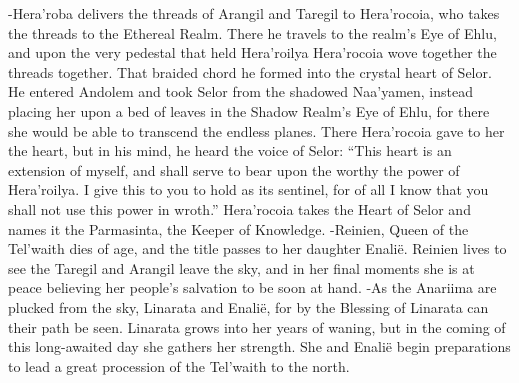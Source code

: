 \documentclass[smalldemyvopaper,11pt,twoside,onecolumn,openright,extrafontsizes]{memoir}
\begin{document}
{{-Hera’roba delivers the threads of Arangil and Taregil to Hera’rocoia, who takes the threads to the Ethereal Realm. There he travels to the realm’s Eye of Ehlu, and upon the very pedestal that held Hera’roilya Hera’rocoia wove together the threads together. That braided chord he formed into the crystal heart of Selor. He entered Andolem and took Selor from the shadowed Naa’yamen, instead placing her upon a bed of leaves in the Shadow Realm’s Eye of Ehlu, for there she would be able to transcend the endless planes. There Hera’rocoia gave to her the heart, but in his mind, he heard the voice of Selor: “This heart is an extension of myself, and shall serve to bear upon the worthy the power of Hera’roilya. I give this to you to hold as its sentinel, for of all I know that you shall not use this power in wroth.” Hera’rocoia takes the Heart of Selor and names it the Parmasinta, the Keeper of Knowledge.
-Reinien, Queen of the Tel’waith dies of age, and the title passes to her daughter Enalië. Reinien lives to see the Taregil and Arangil leave the sky, and in her final moments she is at peace believing her people’s salvation to be soon at hand.
-As the Anariima are plucked from the sky, Linarata and Enalië, for by the Blessing of Linarata can their path be seen. Linarata grows into her years of waning, but in the coming of this long-awaited day she gathers her strength. She and Enalië begin preparations to lead a great procession of the Tel’waith to the north.

}}
\end{document}
